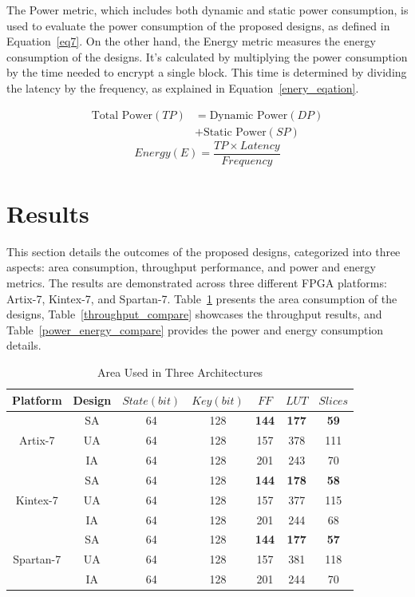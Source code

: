 \documentclass[final,5p,times,twocolumn]{elsarticle}
\begin{document}
The Power metric, which includes both dynamic and static power consumption, is used to evaluate the power consumption of the proposed designs, as defined in Equation~\ref{eq7}.
On the other hand, the Energy metric measures the energy consumption of the designs. It's calculated by multiplying the power consumption by the time needed to encrypt a single block. This time is determined by dividing the latency by the frequency, as explained in Equation~\ref{enery_eqation}.

\begin{align}
    \text{Total Power} (TP) & = \text{Dynamic Power} (DP) \nonumber \\
                            & + \text{Static Power} (SP)
    \label{eq7}
\end{align}
\begin{equation}
    Energy(E) = \frac{TP \times Latency }{Frequency}
    \label{enery_eqation}
\end{equation}


\section{Results}\label{sec5}

This section details the outcomes of the proposed designs, categorized into three aspects: area consumption, throughput performance, and power and energy metrics.
The results are demonstrated across three different FPGA platforms: Artix-7, Kintex-7, and Spartan-7.
Table~\ref{area_compare} presents the area consumption of the designs, Table~\ref{throughput_compare} showcases the throughput results, and Table~\ref{power_energy_compare} provides the power and energy consumption details.


\begin{table}[h]
    \caption{Area Used in Three Architectures}\label{area_compare}%
    \begin{tabular*}{\textwidth}{@{\extracolsep\fill}|c|c|c|c|c|c|c|}
        \hline
        Platform & Design & $State(bit)$ & $Key(bit)$ & $FF$ & $LUT$ & $Slices$ \\
        \hline
        \multirow{3}{*}{Artix-7}  & SA & 64 & 128 & \textbf{144} & \textbf{177} & \textbf{59} \\
        & UA & 64 & 128 & 157 & 378 & 111 \\
        & IA & 64 & 128 & 201 & 243 & 70 \\
        \hline
        \multirow{3}{*}{Kintex-7} & SA & 64 & 128 & \textbf{144} & \textbf{178} & \textbf{58}\\
        & UA & 64 & 128 & 157 & 377 & 115 \\
        & IA & 64 & 128 & 201 & 244 & 68 \\
        \hline
        \multirow{3}{*}{Spartan-7} & SA & 64 & 128 & \textbf{144} & \textbf{177} & \textbf{57}\\
        & UA & 64 & 128 & 157 & 381 & 118 \\
        & IA & 64 & 128 & 201 & 244 & 70 \\
        \hline
    \end{tabular*}
\end{table}
\end{document}

